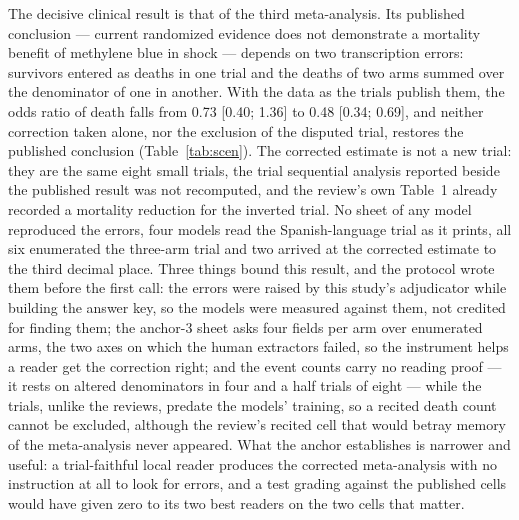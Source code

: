 \documentclass[11pt]{article}
\begin{document}
The decisive clinical result is that of the third meta-analysis. Its published conclusion --- current randomized evidence does not demonstrate a mortality benefit of methylene blue in shock --- depends on two transcription errors: survivors entered as deaths in one trial and the deaths of two arms summed over the denominator of one in another. With the data as the trials publish them, the odds ratio of death falls from 0.73 [0.40; 1.36] to 0.48 [0.34; 0.69], and neither correction taken alone, nor the exclusion of the disputed trial, restores the published conclusion (Table~\ref{tab:scen}). The corrected estimate is not a new trial: they are the same eight small trials, the trial sequential analysis reported beside the published result was not recomputed, and the review's own Table~1 already recorded a mortality reduction for the inverted trial. No sheet of any model reproduced the errors, four models read the Spanish-language trial as it prints, all six enumerated the three-arm trial and two arrived at the corrected estimate to the third decimal place. Three things bound this result, and the protocol wrote them before the first call: the errors were raised by this study's adjudicator while building the answer key, so the models were measured against them, not credited for finding them; the anchor-3 sheet asks four fields per arm over enumerated arms, the two axes on which the human extractors failed, so the instrument helps a reader get the correction right; and the event counts carry no reading proof --- it rests on altered denominators in four and a half trials of eight --- while the trials, unlike the reviews, predate the models' training, so a recited death count cannot be excluded, although the review's recited cell that would betray memory of the meta-analysis never appeared. What the anchor establishes is narrower and useful: a trial-faithful local reader produces the corrected meta-analysis with no instruction at all to look for errors, and a test grading against the published cells would have given zero to its two best readers on the two cells that matter.
\end{document}
